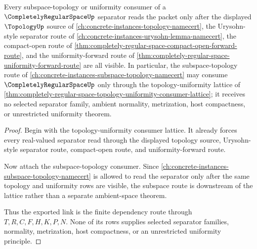 \begin{theorem}
\label{thm:completely-regular-space-subspace-uniformity-forward-link}
Every subspace-topology or uniformity consumer of a $\CompletelyRegularSpaceUp$ separator reads the packet only after the displayed $\TopologyUp$ source of \autoref{ch:concrete-instances-topology-namecert}, the Urysohn-style separator route of \autoref{ch:concrete-instances-urysohn-lemma-namecert}, the compact-open route of \autoref{thm:completely-regular-space-compact-open-forward-route}, and the uniformity-forward route of \autoref{thm:completely-regular-space-uniformity-forward-route} are all visible. In particular, the subspace-topology route of \autoref{ch:concrete-instances-subspace-topology-namecert} may consume $\CompletelyRegularSpaceUp$ only through the topology-uniformity lattice of \autoref{thm:completely-regular-space-topology-uniformity-consumer-lattice}; it receives no selected separator family, ambient normality, metrization, host compactness, or unrestricted uniformity theorem.
\end{theorem}
\begin{proof}
Begin with the topology-uniformity consumer lattice. It already forces every real-valued separator read through the displayed topology source, Urysohn-style separator route, compact-open route, and uniformity-forward route.

Now attach the subspace-topology consumer. Since \autoref{ch:concrete-instances-subspace-topology-namecert} is allowed to read the separator only after the same topology and uniformity rows are visible, the subspace route is downstream of the lattice rather than a separate ambient-space theorem.

Thus the exported link is the finite dependency route through $T,R,C,F,H,K,P,N$. None of its rows supplies selected separator families, normality, metrization, host compactness, or an unrestricted uniformity principle.
\end{proof}
